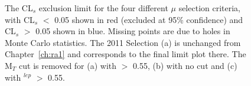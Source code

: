 \begin{figure}[htbp]
\centering
{}
\caption{\label{fig:4fit}The CL$_{s}$ exclusion limit for the four different $\mu$ selection criteria, with CL$_{s}$ $<$ 0.05 shown in red (excluded at 95\% confidence) and CL$_{s}$ $>$ 0.05 shown in blue. Missing points are due to holes in Monte Carlo statistics. The 2011 Selection (a) is unchanged from Chapter~\ref{ch:ra1} and corresponds to the final limit plot there. The M$_{T}$ cut is removed for (a) with \alt $>$ 0.55, (b) with no \alt cut and (c) with \alt$^{lep}$ $>$ 0.55.}
\end{figure}









